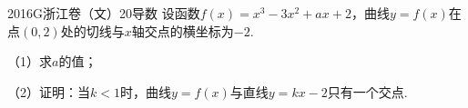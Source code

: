 
\begin{problem}{2016}{G}{浙江卷（文）}{20}{导数}
设函数$f(x)=x^3-3x^2+ax+2$，曲线$y=f(x)$在点$(0,2)$处的切线与$x$轴交点的横坐标为$-2$.

（1）求$a$的值；

（2）证明：当$k<1$时，曲线$y=f(x)$与直线$y=kx-2$只有一个交点.
\end{problem}